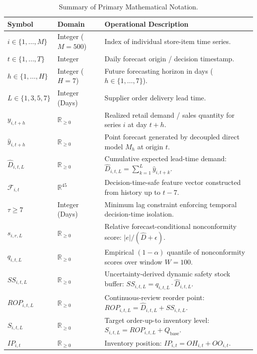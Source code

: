 \documentclass[11pt,a4paper]{article}
\begin{document}
\begin{table}[htbp]
\centering
\small
\caption{Summary of Primary Mathematical Notation.}
\label{tab:app_notation}
\begin{tabular}{llp{8cm}}
\toprule
\textbf{Symbol} & \textbf{Domain} & \textbf{Operational Description} \\
\midrule
$i \in \{1,\dots,M\}$ & Integer ($M=500$) & Index of individual store-item time series. \\
$t \in \{1,\dots,T\}$ & Integer & Daily forecast origin / decision timestamp. \\
$h \in \{1,\dots,H\}$ & Integer ($H=7$) & Future forecasting horizon in days ($h \in \{1, \dots, 7\}$). \\
$L \in \{1, 3, 5, 7\}$ & Integer (Days) & Supplier order delivery lead time. \\
$y_{i,t+h}$ & $\mathbb{R}_{\ge 0}$ & Realized retail demand / sales quantity for series $i$ at day $t+h$. \\
$\hat{y}_{i,t+h}$ & $\mathbb{R}_{\ge 0}$ & Point forecast generated by decoupled direct model $M_h$ at origin $t$. \\
$\hat{D}_{i,t,L}$ & $\mathbb{R}_{\ge 0}$ & Cumulative expected lead-time demand: $\hat{D}_{i,t,L} = \sum_{k=1}^L \hat{y}_{i,t+k}$. \\
$\mathcal{F}_{i,t}$ & $\mathbb{R}^{45}$ & Decision-time-safe feature vector constructed from history up to $t-7$. \\
$\tau \ge 7$ & Integer (Days) & Minimum lag constraint enforcing temporal decision-time isolation. \\
$s_{i,r,L}$ & $\mathbb{R}_{\ge 0}$ & Relative forecast-conditional nonconformity score: $|e| / (\hat{D} + \epsilon)$. \\
$q_{i,t,L}$ & $\mathbb{R}_{\ge 0}$ & Empirical $(1-\alpha)$ quantile of nonconformity scores over window $W=100$. \\
$SS_{i,t,L}$ & $\mathbb{R}_{\ge 0}$ & Uncertainty-derived dynamic safety stock buffer: $SS_{i,t,L} = q_{i,t,L} \cdot \hat{D}_{i,t,L}$. \\
$ROP_{i,t,L}$ & $\mathbb{R}_{\ge 0}$ & Continuous-review reorder point: $ROP_{i,t,L} = \hat{D}_{i,t,L} + SS_{i,t,L}$. \\
$S_{i,t,L}$ & $\mathbb{R}_{\ge 0}$ & Target order-up-to inventory level: $S_{i,t,L} = ROP_{i,t,L} + Q_{\text{base}}$. \\
$IP_{i,t}$ & $\mathbb{R}_{\ge 0}$ & Inventory position: $IP_{i,t} = OH_{i,t} + OO_{i,t}$. \\

\end{tabular}
\end{table}
\end{document}
